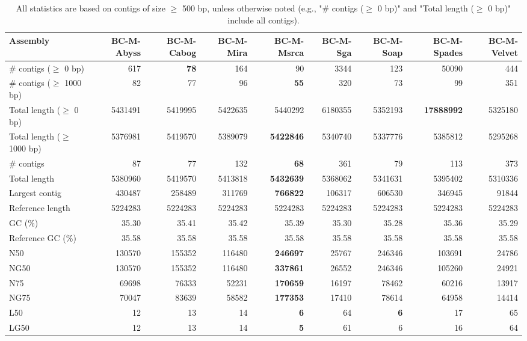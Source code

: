 \documentclass[12pt,a4paper]{article}
\begin{document}
\begin{table}[ht]
\begin{center}
\caption{All statistics are based on contigs of size $\geq$ 500 bp, unless otherwise noted (e.g., "\# contigs ($\geq$ 0 bp)" and "Total length ($\geq$ 0 bp)" include all contigs).}
\begin{tabular}{|l*{8}{|r}|}
\hline
Assembly & BC-M-Abyss & BC-M-Cabog & BC-M-Mira & BC-M-Msrca & BC-M-Sga & BC-M-Soap & BC-M-Spades & BC-M-Velvet \\ \hline
\# contigs ($\geq$ 0 bp) & 617 & {\bf 78} & 164 & 90 & 3344 & 123 & 50090 & 444 \\ \hline
\# contigs ($\geq$ 1000 bp) & 82 & 77 & 96 & {\bf 55} & 320 & 73 & 99 & 351 \\ \hline
Total length ($\geq$ 0 bp) & 5431491 & 5419995 & 5422635 & 5440292 & 6180355 & 5352193 & {\bf 17888992} & 5325180 \\ \hline
Total length ($\geq$ 1000 bp) & 5376981 & 5419570 & 5389079 & {\bf 5422846} & 5340740 & 5337776 & 5385812 & 5295268 \\ \hline
\# contigs & 87 & 77 & 132 & {\bf 68} & 361 & 79 & 113 & 373 \\ \hline
Total length & 5380960 & 5419570 & 5413818 & {\bf 5432639} & 5368062 & 5341631 & 5395402 & 5310336 \\ \hline
Largest contig & 430487 & 258489 & 311769 & {\bf 766822} & 106317 & 606530 & 346945 & 91844 \\ \hline
Reference length & 5224283 & 5224283 & 5224283 & 5224283 & 5224283 & 5224283 & 5224283 & 5224283 \\ \hline
GC (\%) & 35.30 & 35.41 & 35.42 & 35.39 & 35.30 & 35.28 & 35.36 & 35.29 \\ \hline
Reference GC (\%) & 35.58 & 35.58 & 35.58 & 35.58 & 35.58 & 35.58 & 35.58 & 35.58 \\ \hline
N50 & 130570 & 155352 & 116480 & {\bf 246697} & 25767 & 246346 & 103691 & 24786 \\ \hline
NG50 & 130570 & 155352 & 116480 & {\bf 337861} & 26552 & 246346 & 105260 & 24921 \\ \hline
N75 & 69698 & 76333 & 52231 & {\bf 170659} & 16197 & 78462 & 60216 & 13917 \\ \hline
NG75 & 70047 & 83639 & 58582 & {\bf 177353} & 17410 & 78614 & 64958 & 14414 \\ \hline
L50 & 12 & 13 & 14 & {\bf 6} & 64 & {\bf 6} & 17 & 65 \\ \hline
LG50 & 12 & 13 & 14 & {\bf 5} & 61 & 6 & 16 & 64 \\ \hline

\end{tabular}
\end{center}
\end{table}
\end{document}
